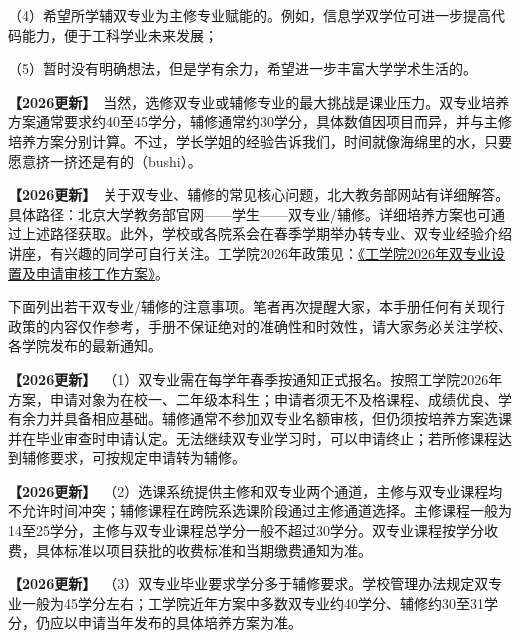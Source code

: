 \documentclass[11pt,oneside]{book}
\newcommand{\updateMark}{\textcolor{chaph}{\textbf{【2026更新】}}\ }
\begin{document}
（4）希望所学辅双专业为主修专业赋能的。例如，信息学双学位可进一步提高代码能力，便于工科学业未来发展；

（5）暂时没有明确想法，但是学有余力，希望进一步丰富大学学术生活的。

\vspace{10pt}

\updateMark 当然，选修双专业或辅修专业的最大挑战是课业压力。双专业培养方案通常要求约40至45学分，辅修通常约30学分，具体数值因项目而异，并与主修培养方案分别计算。不过，学长学姐的经验告诉我们，时间就像海绵里的水，只要愿意挤一挤还是有的（bushi）。

\vspace{10pt}

\updateMark 关于双专业、辅修的常见核心问题，北大教务部网站有详细解答。具体路径：北京大学教务部官网——学生——双专业/辅修。详细培养方案也可通过上述路径获取。此外，学校或各院系会在春季学期举办转专业、双专业经验介绍讲座，有兴趣的同学可自行关注。工学院2026年政策见：\href{https://www.coe.pku.edu.cn/announcements/college/13787.html}{《工学院2026年双专业设置及申请审核工作方案》}。

\vspace{10pt}

下面列出若干双专业/辅修的注意事项。笔者再次提醒大家，本手册任何有关现行政策的内容仅作参考，手册不保证绝对的准确性和时效性，请大家务必关注学校、各学院发布的最新通知。

\vspace{10pt}

\updateMark（1）双专业需在每学年春季按通知正式报名。按照工学院2026年方案，申请对象为在校一、二年级本科生；申请者须无不及格课程、成绩优良、学有余力并具备相应基础。辅修通常不参加双专业名额审核，但仍须按培养方案选课并在毕业审查时申请认定。无法继续双专业学习时，可以申请终止；若所修课程达到辅修要求，可按规定申请转为辅修。

\vspace{10pt}

\updateMark（2）选课系统提供主修和双专业两个通道，主修与双专业课程均不允许时间冲突；辅修课程在跨院系选课阶段通过主修通道选择。主修课程一般为14至25学分，主修与双专业课程总学分一般不超过30学分。双专业课程按学分收费，具体标准以项目获批的收费标准和当期缴费通知为准。

\vspace{10pt}

\updateMark（3）双专业毕业要求学分多于辅修要求。学校管理办法规定双专业一般为45学分左右；工学院近年方案中多数双专业约40学分、辅修约30至31学分，仍应以申请当年发布的具体培养方案为准。
\end{document}
